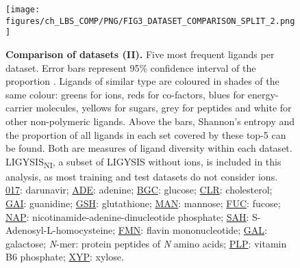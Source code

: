 \begin{figure}[htb!]
    \centering
    \texttt{[image: figures/ch\_LBS\_COMP/PNG/FIG3\_DATASET\_COMPARISON\_SPLIT\_2.png]}
    \caption[Comparison of datasets (II)]{\textbf{Comparison of datasets (II).} Five most frequent ligands per dataset. Error bars represent 95\% confidence interval of the proportion \cite{WILSON_197_PROP_CI}. Ligands of similar type are coloured in shades of the same colour: greens for ions, reds for co-factors, blues for energy-carrier molecules, yellows for sugars, grey for peptides and white for other non-polymeric ligands. Above the bars, Shannon's entropy and the proportion of all ligands in each set covered by these top-5 can be found. Both are measures of ligand diversity within each dataset. LIGYSIS\textsubscript{NI}, a subset of LIGYSIS without ions, is included in this analysis, as most training and test datasets do not consider ions. \href{https://www.ebi.ac.uk/pdbe-srv/pdbechem/chemicalCompound/show/017}{017}: darunavir; \href{https://www.ebi.ac.uk/pdbe-srv/pdbechem/chemicalCompound/show/ADE}{ADE}: adenine; \href{https://www.ebi.ac.uk/pdbe-srv/pdbechem/chemicalCompound/show/BGC}{BGC}: glucose; \href{https://www.ebi.ac.uk/pdbe-srv/pdbechem/chemicalCompound/show/CLR}{CLR}: cholesterol; \href{https://www.ebi.ac.uk/pdbe-srv/pdbechem/chemicalCompound/show/GAI}{GAI}: guanidine; \href{https://www.ebi.ac.uk/pdbe-srv/pdbechem/chemicalCompound/show/GSH}{GSH}: glutathione; \href{https://www.ebi.ac.uk/pdbe-srv/pdbechem/chemicalCompound/show/MAN}{MAN}: mannose; \href{https://www.ebi.ac.uk/pdbe-srv/pdbechem/chemicalCompound/show/FUC}{FUC}: fucose; \href{https://www.ebi.ac.uk/pdbe-srv/pdbechem/chemicalCompound/show/NAP}{NAP}: nicotinamide-adenine-dinucleotide phosphate; \href{https://www.ebi.ac.uk/pdbe-srv/pdbechem/chemicalCompound/show/SAH}{SAH}: S-Adenosyl-L-homocysteine; \href{https://www.ebi.ac.uk/pdbe-srv/pdbechem/chemicalCompound/show/FMN}{FMN}: flavin mononucleotide; \href{https://www.ebi.ac.uk/pdbe-srv/pdbechem/chemicalCompound/show/GAL}{GAL}: galactose; \textit{N}-mer: protein peptides of \textit{N} amino acids; \href{https://www.ebi.ac.uk/pdbe-srv/pdbechem/chemicalCompound/show/PLP}{PLP}: vitamin B6 phosphate; \href{https://www.ebi.ac.uk/pdbe-srv/pdbechem/chemicalCompound/show/XYP}{XYP}: xylose.}
    \label{fig:dataset_comp_2}
\end{figure}

